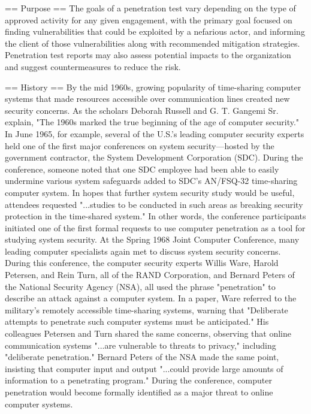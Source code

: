 == Purpose ==
The goals of a penetration test vary depending on the type of approved activity for any given engagement, with the primary goal focused on finding vulnerabilities that could be exploited by a nefarious actor, and informing the client of those vulnerabilities along with recommended mitigation strategies. Penetration test reports may also assess potential impacts to the organization and suggest countermeasures to reduce the risk.


== History ==
By the mid 1960s, growing popularity of time-sharing computer systems that made resources accessible over communication lines created new security concerns. As the scholars Deborah Russell and G. T. Gangemi Sr. explain, "The 1960s marked the true beginning of the age of computer security."
In June 1965, for example, several of the U.S.'s leading computer security experts held one of the first major conferences on system security—hosted by the government contractor, the System Development Corporation (SDC). During the conference, someone noted that one SDC employee had been able to easily undermine various system safeguards added to SDC's AN/FSQ-32 time-sharing computer system. In hopes that further system security study would be useful, attendees requested "...studies to be conducted in such areas as breaking security protection in the time-shared system." In other words, the conference participants initiated one of the first formal requests to use computer penetration as a tool for studying system security.
At the Spring 1968 Joint Computer Conference, many leading computer specialists again met to discuss system security concerns. During this conference, the computer security experts Willis Ware, Harold Petersen, and Rein Turn, all of the RAND Corporation, and Bernard Peters of the National Security Agency (NSA), all used the phrase "penetration" to describe an attack against a computer system. In a paper, Ware referred to the military's remotely accessible time-sharing systems, warning that "Deliberate attempts to penetrate such computer systems must be anticipated." His colleagues Petersen and Turn shared the same concerns, observing that online communication systems "...are vulnerable to threats to privacy," including "deliberate penetration." Bernard Peters of the NSA made the same point, insisting that computer input and output "...could provide large amounts of information to a penetrating program." During the conference, computer penetration would become formally identified as a major threat to online computer systems.
